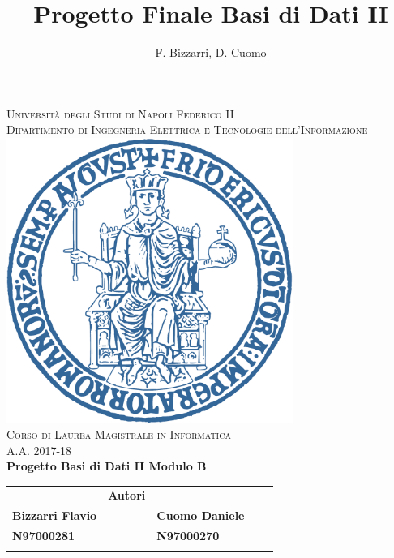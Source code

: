 \documentclass[a4paper,12pt]{book}
\newcommand{\makelogo}{%
	\centering
	\textsc{Università degli Studi di Napoli Federico II}
	\\[.4cm]
	\textsc{Dipartimento di Ingegneria Elettrica e Tecnologie dell'Informazione}
	\\[1.1cm]
	\includegraphics[width=0.7\textwidth]{./figures/logo_blu.png}\\[1.1cm]
	\textsc{Corso di Laurea Magistrale in Informatica\\A.A. 2017-18}
	\\[2.5cm]
	\textbf{Progetto Basi di Dati II Modulo B}
	\vfill
	\centering
	\begin{par}
		\begin{tabular}{lllll}
			& \textbf{Autori} &                        &  &  \\
			\textbf{Bizzarri Flavio} & \textbf{}       & \textbf{Cuomo Daniele} &  &  \\
			\textbf{N97000281}       & \textbf{}       & \textbf{N97000270}     &  &  \\
			&                 &                        &  & 
		\end{tabular}
	
	\end{par}
}
\begin{document}
	
	\onehalfspacing
	\author{F. Bizzarri, D. Cuomo}
	\title{Progetto Finale Basi di Dati II}
	
	{\frontmatter
		\let\cleardoublepage\clearpage{\makelogo}
		\thispagestyle{empty}
		
		
		
		\tableofcontents
		
		\thispagestyle{empty}
		\mainmatter
	}
	
	
	\let\cleardoublepage\clearpage{		
		
		
		
		\appendix
		
		
	}
		
	\backmatter
	
	
\end{document}
